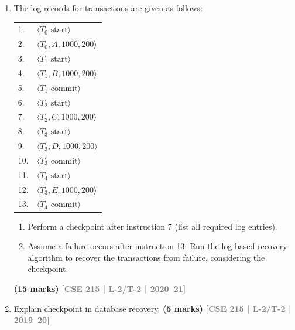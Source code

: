 \documentclass[12pt]{article}
\newcommand{\yr}[1]{\hfill\textcolor{gray}{\small\textbf{[#1]}}}
\newcommand{\mk}[1]{\textcolor{orange!70!black}{\small\textbf{(#1 marks)}}}
\begin{document}
\begin{enumerate}
\item The log records for transactions are given as follows:
\begin{center}
\small\ttfamily
\begin{tabular}{ll}
1. & $\langle T_0 \text{ start} \rangle$\\
2. & $\langle T_0, A, 1000, 200 \rangle$\\
3. & $\langle T_1 \text{ start} \rangle$\\
4. & $\langle T_1, B, 1000, 200 \rangle$\\
5. & $\langle T_1 \text{ commit} \rangle$\\
6. & $\langle T_2 \text{ start} \rangle$\\
7. & $\langle T_2, C, 1000, 200 \rangle$\\
8. & $\langle T_3 \text{ start} \rangle$\\
9. & $\langle T_3, D, 1000, 200 \rangle$\\
10. & $\langle T_3 \text{ commit} \rangle$\\
11. & $\langle T_4 \text{ start} \rangle$\\
12. & $\langle T_3, E, 1000, 200 \rangle$\\
13. & $\langle T_4 \text{ commit} \rangle$\\
\end{tabular}
\end{center}
\begin{enumerate}
  \item Perform a checkpoint after instruction 7 (list all required log entries).
  \item Assume a failure occurs after instruction 13. Run the log-based recovery algorithm to recover the transactions from failure, considering the checkpoint.
\end{enumerate}
\mk{15} \yr{CSE 215 | L-2/T-2 | 2020--21}


\item Explain checkpoint in database recovery.
\mk{5} \yr{CSE 215 | L-2/T-2 | 2019--20}



\end{enumerate}
\end{document}

